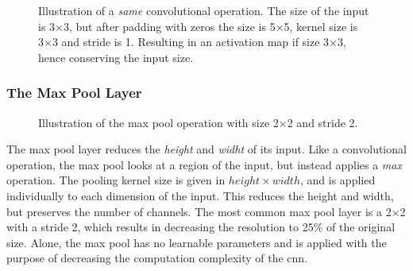     \begin{figure}[H]
        \centering
        
        \caption[Same convolution example]{Illustration of a \textit{same} convolutional operation. The size of the input is 3×3, but after padding with zeros the size is 5×5, kernel size is 3×3 and stride is 1. Resulting in an activation map if size 3×3, hence conserving the input size.}
      	\medskip 
        \label{same_convolutional_fig}
    \end{figure}
    
    
    
\subsubsection{The Max Pool Layer}

    \begin{figure}[H]
        \centering
                
        \caption[The max pool operation]{Illustration of the max pool operation with size 2×2 and stride 2.}
      	\medskip 
        \label{maxpool_fig}
    \end{figure}
    The max pool layer reduces the \textit{height} and \textit{widht} of its input\cite{o2015introduction_convolutions}. Like a convolutional operation, the max pool looks at a region of the input, but instead applies a \textit{max} operation. The pooling kernel size is given in $height \times width$, and is applied individually to each dimension of the input. This reduces the height and width, but preserves the number of channels. The most common max pool layer is a 2×2 with a stride 2, which results in decreasing the resolution to 25\% of the original size. Alone, the max pool has no learnable parameters and is applied with the purpose of decreasing the computation complexity of the \gls{cnn}.


